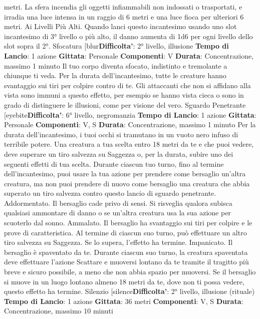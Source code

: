 \begin{multicols}{2}
metri. La sfera incendia gli oggetti infiammabili non
indossati o trasportati, e irradia una luce intensa in un
raggio di 6 metri e una luce fioca per ulteriori 6 metri.
Ai Livelli Più Alti. Quando lanci questo incantesimo
usando uno slot incantesimo di 3° livello o più alto, il
danno aumenta di 1d6 per ogni livello dello slot sopra il
2°.
Sfocatura
[blur\textbf{Difficolta'}:
2° livello, illusione
\textbf{Tempo di Lancio}: 1 azione
\textbf{Gittata}: Personale
\textbf{Componenti}: V
\textbf{Durata}: Concentrazione, massimo 1 minuto
Il tuo corpo diventa sfocato, indistinto e tremolante a
chiunque ti veda. Per la durata dell’incantesimo, tutte le
creature hanno svantaggio sui tiri per colpire contro di
te. Gli attaccanti che non si affidano alla vista sono
immuni a questo effetto, per esempio se hanno vista
cieca o sono in grado di distinguere le illusioni, come
per visione del vero.
Sguardo Penetrante
[eyebite\textbf{Difficolta'}:
6° livello, negromanzia
\textbf{Tempo di Lancio}: 1 azione
\textbf{Gittata}: Personale
\textbf{Componenti}: V, S
\textbf{Durata}: Concentrazione, massimo 1 minuto
Per la durata dell’incantesimo, i tuoi occhi si tramutano
in un vuoto nero infuso di terribile potere. Una creatura
a tua scelta entro 18 metri da te e che puoi vedere,
deve superare un tiro salvezza su Saggezza o, per la
durata, subire uno dei seguenti effetti di tua scelta.
Durante ciascun tuo turno, fino al termine
dell’incantesimo, puoi usare la tua azione per prendere
come bersaglio un’altra creatura, ma non puoi prendere
di nuovo come bersaglio una creatura che abbia
superato un tiro salvezza contro questo lancio di
sguardo penetrante.
Addormentato. Il bersaglio cade privo di sensi. Si
risveglia qualora subisca qualsiasi ammontare di danno
o se un’altra creatura usa la sua azione per scuoterlo
dal sonno.
Ammalato. Il bersaglio ha svantaggio sui tiri per colpire
e le prove di caratteristica. Al termine di ciascun suo
turno, può effettuare un altro tiro salvezza su Saggezza.
Se lo supera, l’effetto ha termine.
Impanicato. Il bersaglio è spaventato da te. Durante
ciascun suo turno, la creatura spaventata deve
effettuare l’azione Scattare e muoversi lontano da te
tramite il tragitto più breve e sicuro possibile, a meno
che non abbia spazio per muoversi. Se il bersaglio si
muove in un luogo lontano almeno 18 metri da te, dove
non ti possa vedere, questo effetto ha termine.
Silenzio
[silence\textbf{Difficolta'}:
2° livello, illusione (rituale)
\textbf{Tempo di Lancio}: 1 azione
\textbf{Gittata}: 36 metri
\textbf{Componenti}: V, S
\textbf{Durata}: Concentrazione, massimo 10 minuti

\end{multicols}
